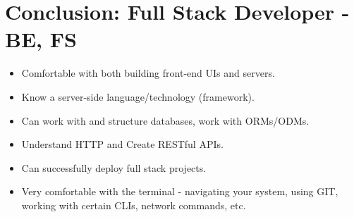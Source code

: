 \section{Conclusion: Full Stack Developer - BE, FS}
\begin{itemize}
    \item Comfortable with both building front-end UIs and servers.
    \item Know a server-side language/technology (framework).
    \item Can work with and structure databases, work with ORMs/ODMs. 
    \item Understand HTTP and Create RESTful APIs.
    \item Can successfully deploy full stack projects.
    \item Very comfortable with the terminal - navigating your system, using GIT, working with certain CLIs, network commands, etc.
\end{itemize}
